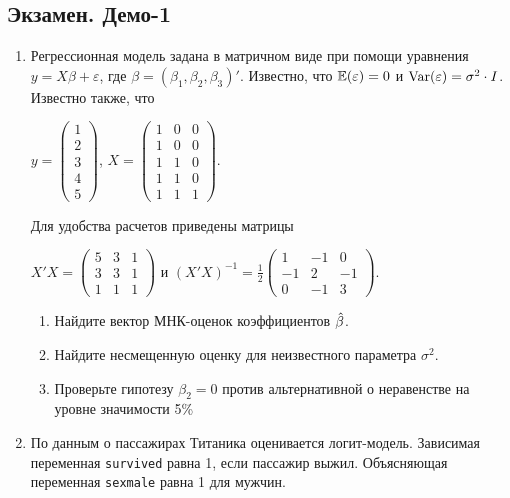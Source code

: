 \documentclass[12pt, a4paper]{article}\usepackage[]{graphicx}\usepackage[]{color}
\begin{document}
\subsection{Экзамен. Демо-1}

\begin{enumerate}
\item Регрессионная модель  задана в матричном виде при помощи уравнения $y=X\beta+\varepsilon$, где $\beta=(\beta_1,\beta_2,\beta_3)'$.
Известно, что $\mathbb{E}(\varepsilon)=0$  и  $\operatorname{Var}(\varepsilon)=\sigma^2\cdot I$.
Известно также, что

$y=\left(
\begin{array}{c}
1\\
2\\
3\\
4\\
5
\end{array}\right)$,
$X=\left(\begin{array}{ccc}
1 & 0 & 0 \\
1 & 0 & 0 \\
1 & 1 & 0 \\
1 & 1 & 0 \\
1 & 1 & 1
\end{array}\right)$.


Для удобства расчетов приведены матрицы


$X'X=\left(
\begin{array}{ccc}
5 & 3 & 1\\
3 & 3 & 1\\
1 & 1 & 1
\end{array}\right)$ и $(X'X)^{-1}=\frac{1}{2}\left(
\begin{array}{ccc}
1 & -1 & 0 \\
-1 & 2 & -1 \\
0 & -1 & 3
\end{array}\right)$.

\begin{enumerate}
\item Найдите вектор МНК-оценок коэффициентов $\hat{\beta}$.
\item Найдите несмещенную оценку для неизвестного параметра $\sigma^2$.
\item Проверьте гипотезу $\beta_2=0$ против альтернативной о неравенстве на уровне значимости 5\%

\end{enumerate}




\item По данным о пассажирах Титаника оценивается логит-модель. Зависимая переменная \verb|survived| равна 1, если пассажир выжил. Объясняющая переменная \verb|sexmale| равна 1 для  мужчин.



\end{enumerate}
\end{document}
